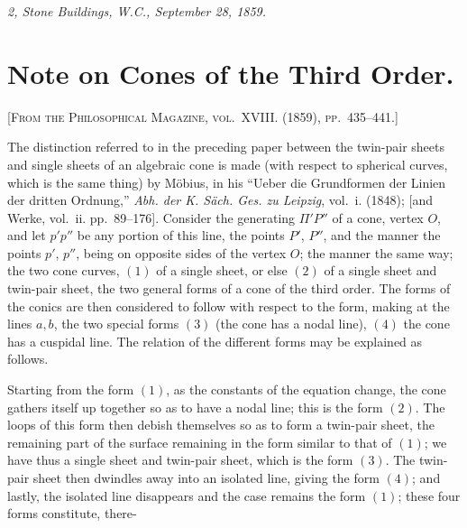 \documentclass[11pt,a4paper]{book}
\begin{document}
\smallskip
\noindent\textit{2, Stone Buildings, W.C., September 28, 1859.}

\newpage


\setcounter{page}{120}

\section*{Note on Cones of the Third Order.}
\label{paper:249}

\textsc{[From the Philosophical Magazine, vol.~XVIII. (1859), pp.~435--441.]}

\medskip

The distinction referred to in the preceding paper between the twin-pair sheets and single sheets of an algebraic cone is made (with respect to spherical curves, which is the same thing) by Möbius, in his ``Ueber die Grundformen der Linien der dritten Ordnung,'' \textit{Abh. der K. Säch. Ges. zu Leipzig}, vol.~i. (1848); [and Werke, vol.~ii. pp.~89--176]. Consider the generating $\Pi'P''$ of a cone, vertex $O$, and let $p'p''$ be any portion of this line, the points $P'$, $P''$, and the manner the points $p'$, $p''$, being on opposite sides of the vertex $O$; the manner the same way; the two cone curves, $(1)$ of a single sheet, or else $(2)$ of a single sheet and twin-pair sheet, the two general forms of a cone of the third order. The forms of the conics are then considered to follow with respect to the form, making at the lines $a, b$, the two special forms $(3)$ (the cone has a nodal line), $(4)$ the cone has a cuspidal line. The relation of the different forms may be explained as follows.

Starting from the form $(1)$, as the constants of the equation change, the cone gathers itself up together so as to have a nodal line; this is the form $(2)$. The loops of this form then debish themselves so as to form a twin-pair sheet, the remaining part of the surface remaining in the form similar to that of $(1)$; we have thus a single sheet and twin-pair sheet, which is the form $(3)$. The twin-pair sheet then dwindles away into an isolated line, giving the form $(4)$; and lastly, the isolated line disappears and the case remains the form $(1)$; these four forms constitute, there-
\end{document}

